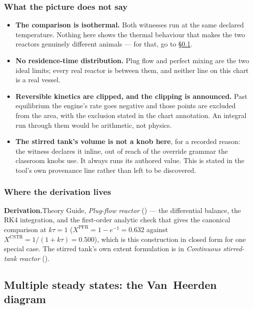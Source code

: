 \documentclass[11pt,a4paper]{article}
\newcommand{\derivation}[1]{%
  \smallskip\noindent\textbf{\sffamily\small Derivation.}\quad #1\par\smallskip}
\begin{document}
\subsubsection*{What the picture does not say}

\begin{itemize}[leftmargin=*,nosep]
  \item \textbf{The comparison is isothermal.}  Both witnesses run at the
        same declared temperature.  Nothing here shows the thermal
        behaviour that makes the two reactors genuinely different animals
        --- for that, go to \S\ref{sec:edu-vanheerden}.
  \item \textbf{No residence-time distribution.}  Plug flow and perfect
        mixing are the two ideal limits; every real reactor is between
        them, and neither line on this chart is a real vessel.
  \item \textbf{Reversible kinetics are clipped, and the clipping is
        announced.}  Past equilibrium the engine's rate goes negative and
        those points are excluded from the area, with the exclusion stated
        in the chart annotation.  An integral run through them would be
        arithmetic, not physics.
  \item \textbf{The stirred tank's volume is not a knob here}, for a
        recorded reason: the witness declares it inline, out of reach of
        the override grammar the classroom knobs use.  It always runs its
        authored value.  This is stated in the tool's own provenance line
        rather than left to be discovered.
\end{itemize}

\subsubsection*{Where the derivation lives}

\derivation{Theory Guide, \emph{Plug-flow reactor} (\theorydest{ch:pfr})
--- the differential balance, the RK4 integration, and the first-order
analytic check that gives the canonical comparison at $k\tau = 1$
($X^{\mathrm{PFR}} = 1 - e^{-1} = 0.632$ against $X^{\mathrm{CSTR}} =
1/(1+k\tau) = 0.500$), which is this construction in closed form for one
special case.  The stirred tank's own extent formulation is in
\emph{Continuous stirred-tank reactor} (\theorydest{ch:cstr}).}

\subsection{Multiple steady states: the Van~Heerden diagram}\label{sec:edu-vanheerden}
\end{document}
